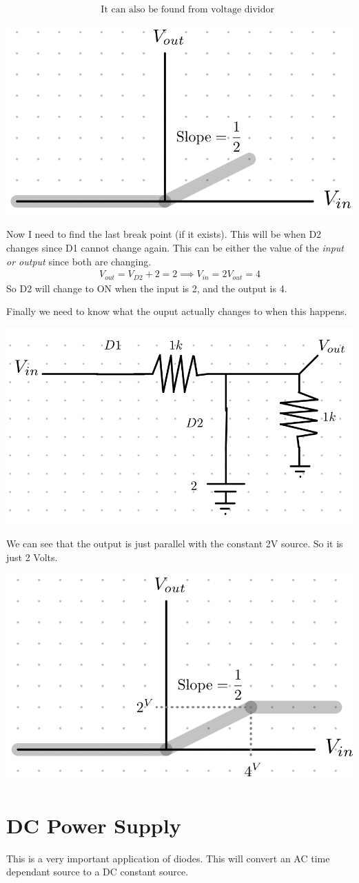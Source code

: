 \documentclass[12pt,letterpaper]{article} \usepackage{amsmath} \usepackage{graphicx} \usepackage[margin=1in]{geometry} \usepackage{longtable}  \usepackage{amssymb}
\begin{document}
\begin{mdframed}[]
\begin{align*}
		&&\text{It can also be found from voltage dividor}
	\end{align*}
	\begin{center}
		\includegraphics[width=0.3\linewidth]{diodes-plotting-1.5}
	\end{center}
	Now I need to find the last break point (if it exists). This will be when D2 changes since D1 cannot change again. This can be either the value of the \textit{input or output} since both are changing. 
	\begin{align*}
		V_{out} = V_{D2} + 2 = 2 \implies V_{in} = 2V_{out} = 4
	\end{align*}
	So D2 will change to ON when the input is 2, and the output is 4. 
	
	Finally we need to know what the ouput actually changes to when this happens.
	\begin{center}
		\includegraphics[width=0.4\linewidth]{diodes-plotting-1.6}
	\end{center}
	We can see that the output is just parallel with the constant 2V source. So it is just 2 Volts. 
	\begin{center}
		\includegraphics[width=0.5\linewidth]{diodes-plotting-1.7}
	\end{center}
	
	\end{mdframed}
	
	\section{DC Power Supply}
	This is a very important application of diodes. This will convert an AC time dependant source to a DC constant source. 
	
\end{document}
